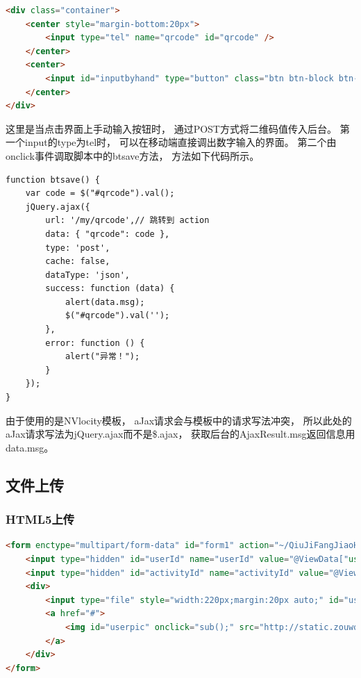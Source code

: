 \documentclass{book}
\begin{document}
\begin{lstlisting}[language=HTML]
<div class="container">           
    <center style="margin-bottom:20px">
        <input type="tel" name="qrcode" id="qrcode" />
    </center>
    <center>
        <input id="inputbyhand" type="button" class="btn btn-block btn-lg btn-danger" onclick="btsave();" value="手动输入验证" />
    </center>
</div>
\end{lstlisting}

这里是当点击界面上手动输入按钮时，
通过POST方式将二维码值传入后台。
第一个input的type为tel时，
可以在移动端直接调出数字输入的界面。
第二个由onclick事件调取脚本中的btsave方法，
方法如下代码所示。

\begin{lstlisting}[language=VBScript]
function btsave() {
    var code = $("#qrcode").val();
    jQuery.ajax({
        url: '/my/qrcode',// 跳转到 action
        data: { "qrcode": code },
        type: 'post',
        cache: false,
        dataType: 'json',
        success: function (data) {                    
            alert(data.msg);
            $("#qrcode").val('');
        },
        error: function () {
            alert("异常！");
        }
    });
}
\end{lstlisting}

由于使用的是NVlocity模板，
aJax请求会与模板中的请求写法冲突，
所以此处的aJax请求写法为jQuery.ajax而不是\$.ajax，
获取后台的AjaxResult.msg返回信息用data.msg。

\subsection{文件上传}

\subsubsection{HTML5上传}

\begin{lstlisting}[language=HTML]
<form enctype="multipart/form-data" id="form1" action="~/QiuJiFangJiaoHui/OriginalUploadImage" method="post">
    <input type="hidden" id="userId" name="userId" value="@ViewData["userId"]" />
    <input type="hidden" id="activityId" name="activityId" value="@ViewData["activityId"]" />
    <div>
        <input type="file" style="width:220px;margin:20px auto;" id="userUploadFile" name="filename" accept="image/*" class='btn btn-warning' />
        <a href="#">
            <img id="userpic" onclick="sub();" src="http://static.zouwo.com/lottery/1.02/images/a16.jpg" style="width:100%">
        </a>
    </div>
</form>
\end{lstlisting}
\end{document}
